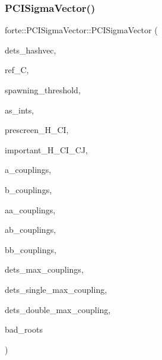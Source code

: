 \subsubsection{\texorpdfstring{P\+C\+I\+Sigma\+Vector()}{PCISigmaVector()}}
{\footnotesize\ttfamily forte\+::\+P\+C\+I\+Sigma\+Vector\+::\+P\+C\+I\+Sigma\+Vector (\begin{DoxyParamCaption}\item[{\mbox{\hyperlink{namespaceforte_aee00ff2f656f0aa613d3f9f1ba01cad5}{det\+\_\+hashvec}} \&}]{dets\+\_\+hashvec,  }\item[{std\+::vector$<$ double $>$ \&}]{ref\+\_\+C,  }\item[{double}]{spawning\+\_\+threshold,  }\item[{std\+::shared\+\_\+ptr$<$ \mbox{\hyperlink{classforte_1_1_active_space_integrals}{Active\+Space\+Integrals}} $>$}]{as\+\_\+ints,  }\item[{std\+::function$<$ bool(double, double, double)$>$}]{prescreen\+\_\+\+H\+\_\+\+CI,  }\item[{std\+::function$<$ bool(double, double, double, double)$>$}]{important\+\_\+\+H\+\_\+\+C\+I\+\_\+\+CJ,  }\item[{const std\+::vector$<$ std\+::tuple$<$ int, double, std\+::vector$<$ std\+::tuple$<$ int, double $>$$>$$>$$>$ \&}]{a\+\_\+couplings,  }\item[{const std\+::vector$<$ std\+::tuple$<$ int, double, std\+::vector$<$ std\+::tuple$<$ int, double $>$$>$$>$$>$ \&}]{b\+\_\+couplings,  }\item[{const std\+::vector$<$ std\+::tuple$<$ int, int, double, std\+::vector$<$ std\+::tuple$<$ int, int, double $>$$>$$>$$>$ \&}]{aa\+\_\+couplings,  }\item[{const std\+::vector$<$ std\+::tuple$<$ int, int, double, std\+::vector$<$ std\+::tuple$<$ int, int, double $>$$>$$>$$>$ \&}]{ab\+\_\+couplings,  }\item[{const std\+::vector$<$ std\+::tuple$<$ int, int, double, std\+::vector$<$ std\+::tuple$<$ int, int, double $>$$>$$>$$>$ \&}]{bb\+\_\+couplings,  }\item[{std\+::unordered\+\_\+map$<$ \mbox{\hyperlink{namespaceforte_a2076c63fd7b8732004d9e1442ce527c1}{Determinant}}, std\+::pair$<$ double, double $>$, \mbox{\hyperlink{structforte_1_1_bit_array_1_1_hash}{Determinant\+::\+Hash}} $>$ \&}]{dets\+\_\+max\+\_\+couplings,  }\item[{double}]{dets\+\_\+single\+\_\+max\+\_\+coupling,  }\item[{double}]{dets\+\_\+double\+\_\+max\+\_\+coupling,  }\item[{const std\+::vector$<$ std\+::pair$<$ \mbox{\hyperlink{namespaceforte_aee00ff2f656f0aa613d3f9f1ba01cad5}{det\+\_\+hashvec}}, std\+::vector$<$ double $>$$>$$>$ \&}]{bad\+\_\+roots }\end{DoxyParamCaption})}



